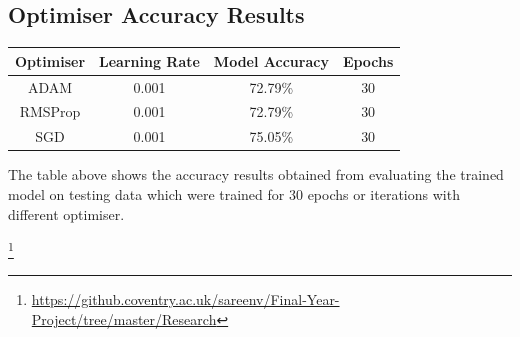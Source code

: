 \subsection{Optimiser Accuracy Results}

\begin{center}
    \begin{tabular} {|c | c | c | c |}
    
        \hline
        Optimiser & Learning Rate & Model Accuracy & Epochs \\ 
        \hline
        ADAM & 0.001 & 72.79\% & 30 \\ 
        \hline 
        RMSProp & 0.001 & 72.79\% & 30  \\
        \hline 
        SGD & 0.001 & 75.05\% & 30  \\
        \hline
    \end{tabular}
\end{center}

The table above shows the accuracy results obtained from evaluating the 
trained model on testing data which were trained for 30 epochs or iterations with different optimiser.

\footnote{\url{https://github.coventry.ac.uk/sareenv/Final-Year-Project/tree/master/Research}}
